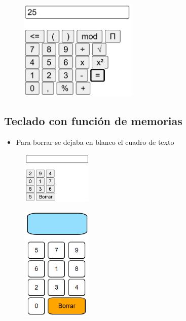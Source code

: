 \documentclass{article}
\begin{document}
	\begin{figure}[H]
		\centering
		\includegraphics[width=0.5\textwidth,keepaspectratio]{img/calc03.png}
	\end{figure}
\subsection{Teclado con función de memorias}
	
	\begin{itemize}	
		\item Para borrar se dejaba en blanco el cuadro de texto
	\end{itemize}
	
	
	\begin{figure}[H]
		\centering
		\includegraphics[width=0.3\textwidth,keepaspectratio]{img/tec02.png}
	\end{figure}
	\begin{figure}[H]
		\centering
		\includegraphics[width=0.3\textwidth,keepaspectratio]{img/tec03.png}
	\end{figure}
\end{document}
